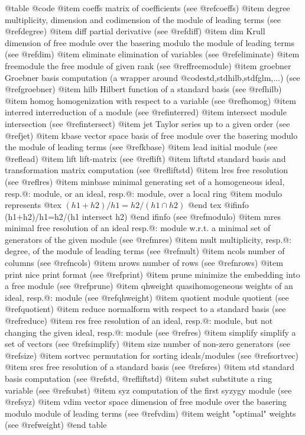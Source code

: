 {{{{{{@table @code
@item coeffs
matrix of coefficients (see @ref{coeffs})
@item degree
multiplicity, dimension and codimension of the module of leading terms (see @ref{degree})
@item diff
partial derivative (see @ref{diff})
@item dim
Krull dimension of free module over the basering modulo the module of leading terms (see @ref{dim})
@item eliminate
elimination of variables (see @ref{eliminate})
@item freemodule
the free module of given rank (see @ref{freemodule})
@item groebner
Groebner basis computation (a wrapper around @code{std,stdhilb,stdfglm},...)
(see @ref{groebner})
@item hilb
Hilbert function of a standard basis (see @ref{hilb})
@item homog
homogenization with respect to a variable (see @ref{homog})
@item interred
interreduction of a module (see @ref{interred})
@item intersect
module intersection (see @ref{intersect})
@item jet
Taylor series up to a given order (see @ref{jet})
@item kbase
vector space basis of free module over the basering modulo the module of
leading terms (see @ref{kbase})
@item lead
initial module (see @ref{lead})
@item lift
lift-matrix (see @ref{lift})
@item liftstd
standard basis and transformation matrix computation (see @ref{liftstd})
@item lres
free resolution (see @ref{lres})
@item minbase
minimal generating set of a homogeneous ideal, resp.@: module, or an ideal, resp.@: module,
over a local ring
@item modulo
represents
@tex
$(h1+h2)/h1=h2/(h1 \cap h2)$
@end tex
@ifinfo
(h1+h2)/h1=h2/(h1 intersect h2)
@end ifinfo
(see @ref{modulo})
@item mres
minimal free resolution of an ideal resp.@: module w.r.t. a minimal set of generators of the given module
(see @ref{mres})
@item mult
multiplicity, resp.@: degree, of the module of leading terms (see @ref{mult})
@item ncols
number of columns (see @ref{ncols})
@item nrows
number of rows (see @ref{nrows})
@item print
nice print format (see @ref{print})
@item prune
minimize the embedding into a free module (see @ref{prune})
@item qhweight
quasihomogeneous weights of an ideal, resp.@: module (see @ref{qhweight})
@item quotient
module quotient (see @ref{quotient})
@item reduce
normalform with respect to a standard basis (see @ref{reduce})
@item res
free resolution of an ideal, resp.@: module, but not changing the given ideal, resp.@: module
(see @ref{res})
@item simplify
simplify a set of vectors (see @ref{simplify})
@item size
number of non-zero generators (see @ref{size})
@item sortvec
permutation for sorting ideals/modules (see @ref{sortvec})
@item sres
free resolution of a standard basis (see @ref{sres})
@item std
standard basis computation (see @ref{std}, @ref{liftstd})
@item subst
substitute a ring variable (see @ref{subst})
@item syz
computation of the first syzygy module (see @ref{syz})
@item vdim
vector space dimension of free module over the basering modulo module
of leading terms (see @ref{vdim})
@item weight
"optimal" weights (see @ref{weight})
@end table

}}}}}}
